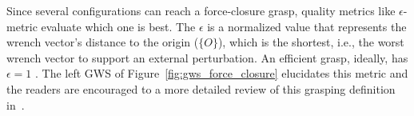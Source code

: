 \begin{figure}[h!]
\end{figure}

Since several configurations can reach a force-closure grasp, quality metrics like $\epsilon$-metric evaluate which one is best. The $\epsilon$ is a normalized value that represents the wrench vector's distance to the origin ($\{O\}$), which is the shortest, i.e., the worst wrench vector to support an external perturbation. An efficient grasp, ideally, has $\epsilon=1$ . The left GWS of Figure~\ref{fig:gws_force_closure} elucidates this metric and the readers are encouraged to a more detailed review of this grasping definition in~\cite{Ferrari}.


